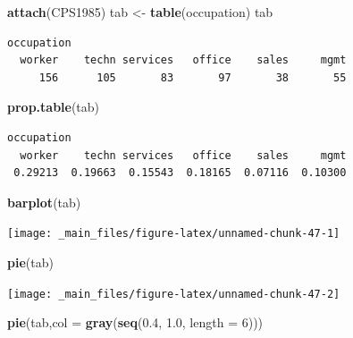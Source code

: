 \documentclass[
]{book}
\newenvironment{Shaded}{\begin{snugshade}}{\end{snugshade}}
\newcommand{\DataTypeTok}[1]{\textcolor[rgb]{0.13,0.29,0.53}{#1}}
\newcommand{\DecValTok}[1]{\textcolor[rgb]{0.00,0.00,0.81}{#1}}
\newcommand{\FloatTok}[1]{\textcolor[rgb]{0.00,0.00,0.81}{#1}}
\newcommand{\KeywordTok}[1]{\textcolor[rgb]{0.13,0.29,0.53}{\textbf{#1}}}
\newcommand{\NormalTok}[1]{#1}
\newcommand{\StringTok}[1]{\textcolor[rgb]{0.31,0.60,0.02}{#1}}
\begin{document}
\begin{Shaded}
\begin{Highlighting}[]
\KeywordTok{attach}\NormalTok{(CPS1985)}
\NormalTok{tab <-}\StringTok{ }\KeywordTok{table}\NormalTok{(occupation)}
\NormalTok{tab}
\end{Highlighting}
\end{Shaded}

\begin{verbatim}
occupation
  worker    techn services   office    sales     mgmt 
     156      105       83       97       38       55 
\end{verbatim}

\begin{Shaded}
\begin{Highlighting}[]
\KeywordTok{prop.table}\NormalTok{(tab)}
\end{Highlighting}
\end{Shaded}

\begin{verbatim}
occupation
  worker    techn services   office    sales     mgmt 
 0.29213  0.19663  0.15543  0.18165  0.07116  0.10300 
\end{verbatim}

\begin{Shaded}
\begin{Highlighting}[]
\KeywordTok{barplot}\NormalTok{(tab)}
\end{Highlighting}
\end{Shaded}

\begin{center}\texttt{[image: \_main\_files/figure-latex/unnamed-chunk-47-1]} \end{center}

\begin{Shaded}
\begin{Highlighting}[]
\KeywordTok{pie}\NormalTok{(tab)}
\end{Highlighting}
\end{Shaded}

\begin{center}\texttt{[image: \_main\_files/figure-latex/unnamed-chunk-47-2]} \end{center}

\begin{Shaded}
\begin{Highlighting}[]
\KeywordTok{pie}\NormalTok{(tab,}\DataTypeTok{col =} \KeywordTok{gray}\NormalTok{(}\KeywordTok{seq}\NormalTok{(}\FloatTok{0.4}\NormalTok{, }\FloatTok{1.0}\NormalTok{, }\DataTypeTok{length =} \DecValTok{6}\NormalTok{)))}
\end{Highlighting}
\end{Shaded}
\end{document}
